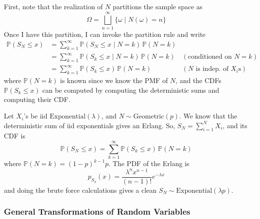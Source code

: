 \documentclass{article}
\begin{document}
      First, note that the realization of $N$ partitions the sample space as 
      \begin{equation}
        \Omega = \bigsqcup_{n = 1}^\infty \{\omega \mid N(\omega) = n\}
      \end{equation}
      Once I have this partition, I can invoke the partition rule and write 
      \begin{align*}
        \mathbb{P}(S_N \leq x) & = \sum_{k=1}^\infty \mathbb{P}(S_N \leq x \mid N = k) \, \mathbb{P}(N = k) \\
        & = \sum_{k=1}^\infty \mathbb{P}(S_k \leq x \mid N = k) \, \mathbb{P}(N = k) & (\text{conditioned on } N = k) \\
        & = \sum_{k=1}^\infty \mathbb{P}(S_k \leq x) \, \mathbb{P}(N = k) & (N \text{ is indep. of } X_i \text{s})
      \end{align*}
      where $\mathbb{P}(N = k)$ is known since we know the PMF of $N$, and the CDFs $\mathbb{P}(S_k \leq x)$ can be computed by computing the deterministic sums and computing their CDF. 

      \begin{example}
        Let $X_i$'s be iid $\mathrm{Exponential}(\lambda)$, and $N \sim \mathrm{Geometric}(p)$. We know that the deterministic sum of iid exponentials gives an Erlang. So, $S_N = \sum_{i=1}^N X_i$, and its CDF is 
        \begin{equation}
          \mathbb{P}(S_N \leq x) = \sum_{k=1}^\infty \mathbb{P}(S_k \leq x) \, \mathbb{P}(N = k)
        \end{equation}
        where $\mathbb{P}(N = k) = (1 - p)^{k - 1} p$. The PDF of the Erlang is 
        \begin{equation}
          p_{S_k} (x) = \frac{\lambda^n x^{n-1}}{(n - 1)!} e^{-\lambda x}
        \end{equation}
        and doing the brute force calculations gives a clean $S_N \sim \mathrm{Exponential}(\lambda p)$. 
      \end{example}

    \subsubsection{General Transformations of Random Variables}
\end{document}
